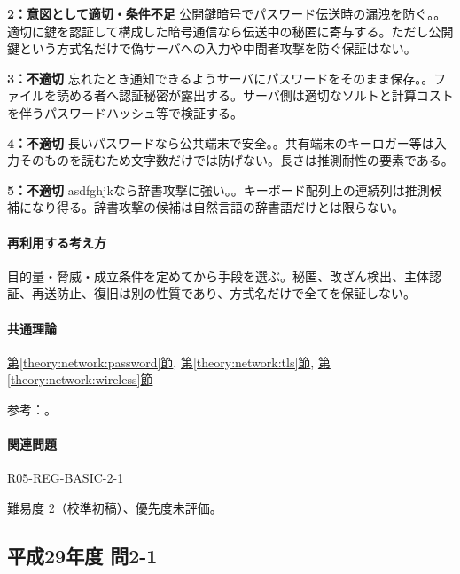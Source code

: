 \noindent\textbf{2：意図として適切・条件不足} 公開鍵暗号でパスワード伝送時の漏洩を防ぐ。。適切に鍵を認証して構成した暗号通信なら伝送中の秘匿に寄与する。ただし公開鍵という方式名だけで偽サーバへの入力や中間者攻撃を防ぐ保証はない。\par

\noindent\textbf{3：不適切} 忘れたとき通知できるようサーバにパスワードをそのまま保存。。ファイルを読める者へ認証秘密が露出する。サーバ側は適切なソルトと計算コストを伴うパスワードハッシュ等で検証する。\par

\noindent\textbf{4：不適切} 長いパスワードなら公共端末で安全。。共有端末のキーロガー等は入力そのものを読むため文字数だけでは防げない。長さは推測耐性の要素である。\par

\noindent\textbf{5：不適切} asdfghjkなら辞書攻撃に強い。。キーボード配列上の連続列は推測候補になり得る。辞書攻撃の候補は自然言語の辞書語だけとは限らない。\par

\paragraph{再利用する考え方} 目的量・脅威・成立条件を定めてから手段を選ぶ。秘匿、改ざん検出、主体認証、再送防止、復旧は別の性質であり、方式名だけで全てを保証しない。

\paragraph{共通理論} \hyperref[theory:network:password]{第\ref*{theory:network:password}節}, \hyperref[theory:network:tls]{第\ref*{theory:network:tls}節}, \hyperref[theory:network:wireless]{第\ref*{theory:network:wireless}節}

\par 参考：\cite{net_nist2017,net_nist2025,net_wep}。

\paragraph{関連問題} \hyperref[q:r05-reg-basic-2-1]{R05-REG-BASIC-2-1}

\par 難易度 2（校準初稿）、優先度未評価。

\subsection{平成29年度 問2-1}
\label{q:h29-reg-basic-2-1}

